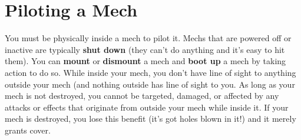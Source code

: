 \section{Piloting a Mech}

You must be physically inside a mech to pilot it. Mechs that are powered off or inactive are typically \textbf{shut down} (they can’t do anything and it’s easy to hit them). You can \textbf{mount} or \textbf{dismount} a mech and \textbf{boot up} a mech by taking action to do so. While inside your mech, you don’t have line of sight to anything outside your mech (and nothing outside has line of sight to you. As long as your mech is not destroyed, you cannot be targeted, damaged, or affected by any attacks or effects that originate from outside your mech while inside it. If your mech is destroyed, you lose this benefit (it’s got holes blown in it!) and it merely grants cover.
